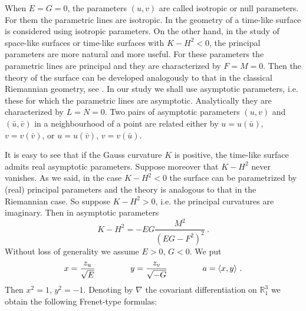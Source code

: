 \documentclass[12pt]{amsart}
\theoremstyle{definition}
\theoremstyle{remark}
\begin{document}
When $E=G=0$, the parameters $(u,v)$ are called isotropic or null parameters. For them the parametric 
lines are isotropic. In \cite{K-K-M} the geometry of a time-like
surface is considered using isotropic parameters. On the other hand, in the study of space-like surfaces or  time-like surfaces  with
$K-H^2<0$, the principal parameters are more natural and more useful. For these parameters the parametric lines are principal and
they are characterized by $F=M=0$. Then the theory of the surface can be developed 
analogously to that in the classical Riemannian geometry, see \cite{G-V-2013}.  In our study we shall use asymptotic parameters, i.e. these for which 
the parametric lines are asymptotic.  Analytically they are characterized by $L=N=0$. 
Two pairs of asymptotic parameters $(u, v)$ and $(\bar u,\bar v)$  in
a neighbourhood of a  point are related either by $u = u(\bar u)$, $v = v(\bar v)$, or
$u = u(\bar v)$, $v = v(\bar u)$.

It is easy to see that if the Gauss curvature $K$ is positive, the time-like surface admits real asymptotic parameters.
Suppose moreover that $K-H^2$ never vanishes. As we said, in the case $K-H^2<0$
the surface can be parametrized by (real) principal parameters and the theory is analogous 
to that in the Riemannian case. So suppose $K-H^2>0$, i.e. the principal curvatures are imaginary. Then
in asymptotic parameters 
$$
	K-H^2=-EG\frac{M^2}{(EG-F^2)^2} \ .
$$
Without loss of generality we assume  $E>0$, $G<0$. We put
$$
	x=\frac{z_u}{\sqrt E}  \hspace{1.5cm}   y=\frac{z_v}{\sqrt{-G}}   \hspace{1.5cm}  a=\langle x,y \rangle \ .
$$
Then $x^2=1$, $y^2=-1$. Denoting by $\nabla$ the covariant differentiation on $\mathbb R^3_1$ 
we obtain the following Frenet-type formulas:
\end{document}
